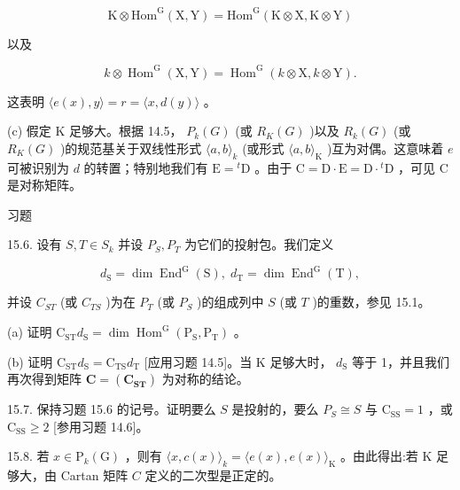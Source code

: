 \documentclass[10pt]{article}
\begin{document}
\[
\mathrm{K} \otimes  {\mathrm{{Hom}}}^{\mathrm{G}}\left( {\mathrm{X},\mathrm{Y}}\right)  = {\mathrm{{Hom}}}^{\mathrm{G}}\left( {\mathrm{K} \otimes  \mathrm{X},\mathrm{K} \otimes  \mathrm{Y}}\right)
\]

以及

\[
k \otimes  {\operatorname{Hom}}^{\mathrm{G}}\left( {\mathrm{X},\mathrm{Y}}\right)  = {\operatorname{Hom}}^{\mathrm{G}}\left( {k \otimes  \mathrm{X},k \otimes  \mathrm{Y}}\right) .
\]

这表明 \(\langle e\left( x\right) ,y\rangle  = r = \langle x,d\left( y\right) \rangle\) 。

(c) 假定 \(\mathrm{K}\) 足够大。根据 14.5， \({P}_{k}\left( G\right)\) (或 \({R}_{K}\left( G\right)\) )以及 \({R}_{k}\left( G\right)\) (或 \({R}_{K}\left( G\right)\) )的规范基关于双线性形式 \(\langle a,b{\rangle }_{k}\) (或形式 \(\langle a,b{\rangle }_{\mathrm{K}}\) )互为对偶。这意味着 \(e\) 可被识别为 \(d\) 的转置；特别地我们有 \(\mathrm{E} = {}^{t}\mathrm{D}\) 。由于 \(\mathrm{C} = \mathrm{D} \cdot  \mathrm{E} = \mathrm{D} \cdot  {}^{t}\mathrm{D}\) ，可见 \(\mathrm{C}\) 是对称矩阵。

习题

15.6. 设有 \(S,T \in  {S}_{k}\) 并设 \({P}_{S},{P}_{T}\) 为它们的投射包。我们定义

\[
{d}_{\mathrm{S}} = \dim {\operatorname{End}}^{\mathrm{G}}\left( \mathrm{S}\right) ,\;{d}_{\mathrm{T}} = \dim {\operatorname{End}}^{\mathrm{G}}\left( \mathrm{T}\right) ,
\]

并设 \({C}_{ST}\) (或 \({C}_{TS}\) )为在 \({P}_{T}\) (或 \({P}_{S}\) )的组成列中 \(S\) (或 \(T\) )的重数，参见 15.1。

(a) 证明 \({\mathrm{C}}_{\mathrm{{ST}}}{d}_{\mathrm{S}} = \dim {\operatorname{Hom}}^{\mathrm{G}}\left( {{\mathrm{P}}_{\mathrm{S}},{\mathrm{P}}_{\mathrm{T}}}\right)\) 。

(b) 证明 \({\mathrm{C}}_{\mathrm{{ST}}}{d}_{\mathrm{S}} = {\mathrm{C}}_{\mathrm{{TS}}}{d}_{\mathrm{T}}\) [应用习题 14.5]。当 \(\mathrm{K}\) 足够大时， \({d}_{\mathrm{S}}\) 等于 1，并且我们再次得到矩阵 \(\mathbf{C} = \left( {\mathbf{C}}_{\mathbf{{ST}}}\right)\) 为对称的结论。

15.7. 保持习题 15.6 的记号。证明要么 \(S\) 是投射的，要么 \({P}_{S} \cong  S\) 与 \({\mathrm{C}}_{\mathrm{{SS}}} = 1\) ，或 \({\mathrm{C}}_{\mathrm{{SS}}} \geq  2\) [参用习题 14.6]。

15.8. 若 \(x \in  {\mathrm{P}}_{k}\left( \mathrm{G}\right)\) ，则有 \(\langle x,c\left( x\right) {\rangle }_{k} = \langle e\left( x\right) ,e\left( x\right) {\rangle }_{\mathrm{K}}\) 。由此得出:若 \(\mathrm{K}\) 足够大，由 Cartan 矩阵 \(C\) 定义的二次型是正定的。
\end{document}
